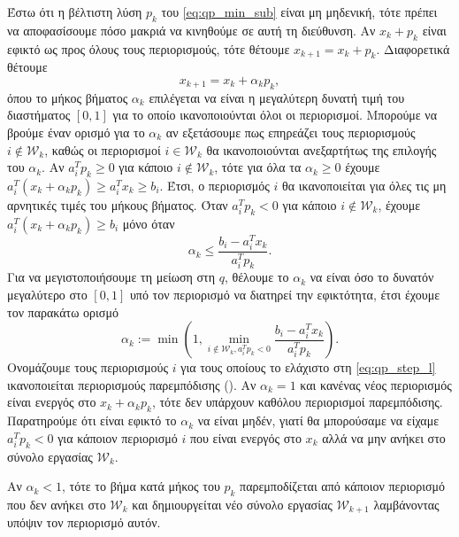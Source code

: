 Έστω ότι η βέλτιστη λύση $p_k$ του \eqref{eq:qp_min_sub} είναι μη μηδενική, τότε
πρέπει να αποφασίσουμε πόσο μακριά να κινηθούμε σε αυτή τη διεύθυνση. Αν
$x_k + p_k$ είναι εφικτό ως προς όλους τους περιορισμούς, τότε θέτουμε
$x_{k+1} = x_k + p_k$. Διαφορετικά θέτουμε
\begin{equation*}
    x_{k+1} = x_k + \alpha_k p_k,
\end{equation*}
όπου το μήκος βήματος $\alpha_k$ επιλέγεται να είναι η μεγαλύτερη δυνατή τιμή του
διαστήματος $[0,1]$ για το οποίο ικανοποιούνται όλοι οι περιορισμοί. Μπορούμε να
βρούμε έναν ορισμό για το $\alpha_k$ αν εξετάσουμε πως επηρεάζει τους
περιορισμούς $i \not\in \mathcal{W}_k$, καθώς οι περιορισμοί $i \in
\mathcal{W}_k$ θα ικανοποιούνται ανεξαρτήτως της επιλογής του $\alpha_k$. Αν
$a_i^Tp_k \geq 0$ για κάποιο $i \not\in \mathcal{W}_k$, τότε για όλα τα
$\alpha_k \geq 0$ έχουμε $a_i^T(x_k + \alpha_k p_k) \geq a_i^Tx_k \geq b_i$.
Έτσι, ο περιορισμός $i$ θα ικανοποιείται για όλες τις μη αρνητικές τιμές του
μήκους βήματος. Όταν $a_i^T p_k < 0$ για κάποιο $i \not\in \mathcal{W}_k$,
έχουμε $a_i^T(x_k + \alpha_k p_k) \geq b_i$ μόνο όταν
\begin{equation*}
    \alpha_k \leq \dfrac{b_i - a_i^Tx_k}{a_i^Tp_k}.
\end{equation*}
Για να μεγιστοποιήσουμε τη μείωση στη $q$, θέλουμε το $\alpha_k$ να είναι όσο το
δυνατόν μεγαλύτερο στο $[0,1]$ υπό τον περιορισμό να διατηρεί την εφικτότητα,
έτσι έχουμε τον παρακάτω ορισμό
\begin{equation}\label{eq:qp_step_l}
    \alpha_k := \min\left( 1,\min_{i \not\in \mathcal{W}_k, a^T_ip_k <
    0}\dfrac{b_i - a^T_i x_k}{a_i^Tp_k} \right).
\end{equation}
Ονομάζουμε τους περιορισμούς $i$ για τους οποίους το ελάχιστο στη
\eqref{eq:qp_step_l} ικανοποιείται περιορισμούς παρεμπόδισης (). Αν $\alpha_k = 1$ και κανένας νέος περιορισμός είναι ενεργός στο $x_k
+ \alpha_k p_k$, τότε δεν υπάρχουν καθόλου περιορισμοί παρεμπόδισης. Παρατηρούμε
ότι είναι εφικτό το $\alpha_k$ να είναι μηδέν, γιατί θα μπορούσαμε να είχαμε
$a_i^Tp_k < 0$ για κάποιον περιορισμό $i$ που είναι ενεργός στο $x_k$ αλλά να
μην ανήκει στο σύνολο εργασίας $\mathcal{W}_k$.

Αν $\alpha_k < 1$, τότε το βήμα κατά μήκος του $p_k$ παρεμποδίζεται από κάποιον
περιορισμό που δεν ανήκει στο $\mathcal{W}_k$ και δημιουργείται νέο σύνολο
εργασίας $\mathcal{W}_{k+1}$ λαμβάνοντας υπόψιν τον περιορισμό αυτόν.

